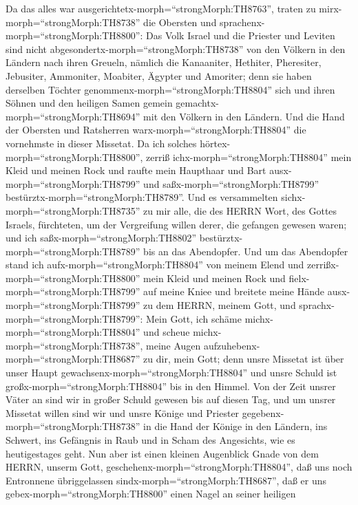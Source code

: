  Da das alles war
ausgerichtetx-morph=``strongMorph:TH8763'', traten zu
mirx-morph=``strongMorph:TH8738'' die Obersten und
sprachenx-morph=``strongMorph:TH8800'': Das Volk Israel und die Priester
und Leviten sind nicht abgesondertx-morph=``strongMorph:TH8738'' von den
Völkern in den Ländern nach ihren Greueln, nämlich die Kanaaniter,
Hethiter, Pheresiter, Jebusiter, Ammoniter, Moabiter, Ägypter und
Amoriter;  denn sie haben derselben Töchter
genommenx-morph=``strongMorph:TH8804'' sich und ihren Söhnen und den
heiligen Samen gemein gemachtx-morph=``strongMorph:TH8694'' mit den
Völkern in den Ländern. Und die Hand der Obersten und Ratsherren
warx-morph=``strongMorph:TH8804'' die vornehmste in dieser Missetat.
 Da ich solches hörtex-morph=``strongMorph:TH8800'', zerriß
ichx-morph=``strongMorph:TH8804'' mein Kleid und meinen Rock und raufte
mein Haupthaar und Bart ausx-morph=``strongMorph:TH8799'' und
saßx-morph=``strongMorph:TH8799''
bestürztx-morph=``strongMorph:TH8789''.  Und es versammelten
sichx-morph=``strongMorph:TH8735'' zu mir alle, die des HERRN Wort, des
Gottes Israels, fürchteten, um der Vergreifung willen derer, die
gefangen gewesen waren; und ich saßx-morph=``strongMorph:TH8802''
bestürztx-morph=``strongMorph:TH8789'' bis an das Abendopfer.
 Und um das Abendopfer stand ich
aufx-morph=``strongMorph:TH8804'' von meinem Elend und
zerrißx-morph=``strongMorph:TH8800'' mein Kleid und meinen Rock und
fielx-morph=``strongMorph:TH8799'' auf meine Kniee und breitete meine
Hände ausx-morph=``strongMorph:TH8799'' zu dem HERRN, meinem Gott,
 und sprachx-morph=``strongMorph:TH8799'': Mein Gott, ich
schäme michx-morph=``strongMorph:TH8804'' und scheue
michx-morph=``strongMorph:TH8738'', meine Augen
aufzuhebenx-morph=``strongMorph:TH8687'' zu dir, mein Gott; denn unsre
Missetat ist über unser Haupt gewachsenx-morph=``strongMorph:TH8804''
und unsre Schuld ist großx-morph=``strongMorph:TH8804'' bis in den
Himmel.  Von der Zeit unsrer Väter an sind wir in großer
Schuld gewesen bis auf diesen Tag, und um unsrer Missetat willen sind
wir und unsre Könige und Priester gegebenx-morph=``strongMorph:TH8738''
in die Hand der Könige in den Ländern, ins Schwert, ins Gefängnis in
Raub und in Scham des Angesichts, wie es heutigestages geht.
 Nun aber ist einen kleinen Augenblick Gnade von dem HERRN,
unserm Gott, geschehenx-morph=``strongMorph:TH8804'', daß uns noch
Entronnene übriggelassen sindx-morph=``strongMorph:TH8687'', daß er uns
gebex-morph=``strongMorph:TH8800'' einen Nagel an seiner heiligen

